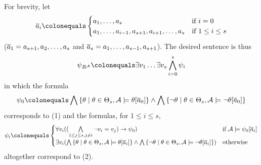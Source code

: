\begin{enumerate}[1.]
\begin{enumerate}[(a)]
For brevity, let
\[
\vect{a}_i \defas
\begin{cases}
a_1, \etc, a_s & \mbox{if \mathmode{i = 0}} \cr
a_1, \etc, a_{i - 1}, a_{s + 1}, a_{i + 1}, \etc, a_s & \mbox{if \mathmode{1 \leq i \leq s}} \cr
\end{cases}
\]
($\overline{a}_1 = a_{s + 1}, a_2, \ldots, a_s$ and $\overline{a}_s = a_1, \ldots, a_{s - 1}, a_{s + 1}$). The desired sentence is thus
\[
\psi_{\intpr{R}{\strct{A}}} \defas \exists v_1 \etc \exists v_s \bland^s_{i = 0} \psi_i
\]
in which the formula
\[
\psi_0 \defas \bland \setm{\theta}{\theta \in \Theta_s, \strct{A} \satis \theta[\vect{a}_0]} \land \bland \setm{\neg\theta}{\theta \in \Theta_s, \strct{A} \satis \neg\theta[\vect{a}_0]}
\]
corresponds to (1) and the formulas, for $1 \leq i \leq s$,
\[
\psi_i \defas
\begin{cases}
\forall v_i ((\bland\limits_{1 \leq j \leq s, j \neq i} \neg v_i = v_j) \lthen \psi_0) & \text{if \mathmode{\strct{A} \satis \psi_0[\vect{a}_i]}}\cr
\exists v_i (\bland \setm{\theta}{\theta \in \Theta_s, \strct{A} \satis \theta[\vect{a}_i]} \land \bland \setm{\neg\theta}{\theta \in \Theta_s, \strct{A} \satis \neg\theta[\vect{a}_i]}) & \text{otherwise}\cr
\end{cases}
\]
altogether correspond to (2).


\end{enumerate}
\end{enumerate}
